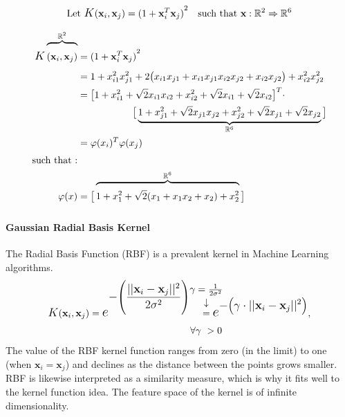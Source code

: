 		\begin{equation}
			\begin{aligned}
				&\text{Let   } \mathlarger{K}(\textbf{x}_i,\textbf{x}_j) = {(1 + \textbf{x}_i^T \textbf{x}_j)}^2 
				&\text{such that   } \textbf{x}: \mathbb{R}^2 \Rightarrow \mathbb{R}^6
			\end{aligned}
			\label{svm_poly_kernel_R2}
		\end{equation}
		
		\begin{equation}
			\begin{split}
				\mathlarger{K} \xoverbrace{(\textbf{x}_i,\textbf{x}_j)}^{\mathbb{R}^2}
				&= {(1 + \textbf{x}_i^T \textbf{x}_j)}^2 \\
				& = 1+ x_{i1}^2 x_{j1}^2 
				+ 2 \big(x_{i1}x_{j1} +  x_{i1}x_{j1}x_{i2}x_{j2} + x_{i2}x_{j2}\big) 
				+ x_{i2}^2 x_{j2}^2 \\ 
				& = \big[
					1 + x_{i1}^2 + \sqrt{2}x_{i1}x_{i2} + x_{i2}^2 + \sqrt{2}x_{i1} + \sqrt{2}x_{i2}
				\big]^T
				\cdot \\
				&\hspace{2cm} \big[
					\underbrace{1 + x_{j1}^2 + \sqrt{2}x_{j1}x_{j2} + x_{j2}^2 + \sqrt{2}x_{j1} + \sqrt{2}x_{j2}}_{\mathbb{R}^6}
				\big] \\
				&= \varphi(x_i)^T\varphi(x_j) \\ 
				\text{such that :}&\\
				 \varphi(x) &= \big[
					 \xoverbrace{1 + x_1^2  + \sqrt{2}(x_1 + x_1x_2 + x_2) + x_2^2}^{\mathbb{R}^6}
				 \big]
			\end{split}
			\raisetag{2\normalbaselineskip}
			\label{svm_poly_kernal_proof}
		\end{equation}
		
	\paragraph{Gaussian Radial Basis Kernel}
		The Radial Basis Function (RBF) is a prevalent kernel in Machine Learning algorithms.
		\begin{equation}
			 \begin{aligned}
				\mathlarger{K}(\textbf{x}_i,\textbf{x}_j) = \mathlarger{\mathlarger{e}}^{
					\displaystyle  -\Bigg(
					\frac{||\textbf{x}_i - \textbf{x}_j||^2}{2 \sigma^2}
					\Bigg)}& \ \ \
				\overset{\mathclap{\tikz \node {$\downarrow$} node [above=1ex] {$\gamma = \frac{1}{2\sigma^2}$};}}{=}
				\mathlarger{\mathlarger{e}}^{\displaystyle  -\big(
					\gamma \cdot ||\textbf{x}_i - \textbf{x}_j||^2
					\big)}, \\
				& \forall \gamma \ > 0 
			 \end{aligned}
		\end{equation}
		The value of the RBF kernel function ranges from zero (in the limit) to one (when $\textbf{x}_i = \textbf{x}_j$) and declines as the distance between the points grows smaller. RBF is likewise interpreted as a similarity measure, which is why it fits well to the kernel function idea. The feature space of the kernel is of infinite dimensionality.
		
